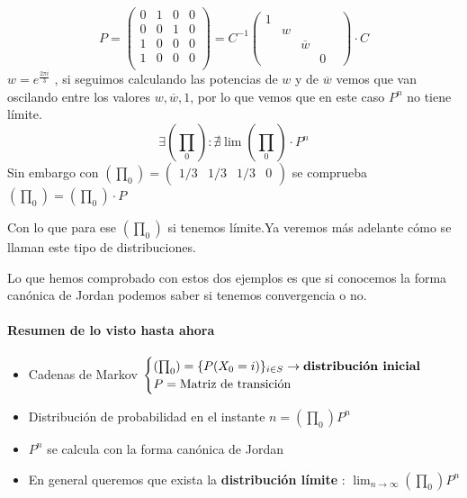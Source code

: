 \begin{example}[2]

	\begin{center}
		\centering
	\end{center}

	$$P = \left( \begin{matrix}
	0 & 1 & 0 & 0\\
	0 & 0 & 1 & 0\\
	1 & 0 & 0 & 0\\
	1 & 0 & 0 & 0\\
	\end{matrix}\right)= C^{-1} \left(\begin{matrix}
	1&&&&\\
	&w&&&\\
	&&\overline{w}&\\
	&&&0
	\end{matrix}
	\right)\cdot C$$
	$w = e^{\frac{2\pi i}{3}}$ , si seguimos calculando las potencias de $w$ y de $\overline{w}$ vemos que van oscilando entre los valores $w , \overline{w} , 1$, por lo que vemos que en este caso $P^n$ no tiene límite.
	$$\exists\left(\prod_0\right) : \nexists \lim \left(\prod_0\right)\cdot P^n$$
	Sin embargo con $(\prod_0) = (\begin{matrix}
	1/3&1/3&1/3&0
	\end{matrix}) $ se comprueba $(\prod_0) = (\prod_0)\cdot P$


	Con lo que para ese $(\prod_0)$ si tenemos límite.Ya veremos más adelante cómo se llaman este tipo de distribuciones.
\end{example}

Lo que hemos comprobado con estos dos ejemplos es que si conocemos la forma canónica de Jordan podemos saber si tenemos convergencia o no.

\paragraph{Resumen de lo visto hasta ahora}
\begin{itemize}
	\item Cadenas de Markov $\begin{cases}
	(\prod_0) = \{P(X_0 = i)\}_{i \in S} \rightarrow \text{\textbf{distribución inicial}}\\
	P = \text{Matriz de transición}
	\end{cases}$
	\item Distribución de probabilidad en el instante $n = (\prod_0)P^n$
	\item $P^n$ se calcula con la forma canónica de Jordan
	\item En general queremos que exista la \textbf{distribución límite} : $\lim_{n\rightarrow\infty} (\prod_0) P^n$
\end{itemize}

